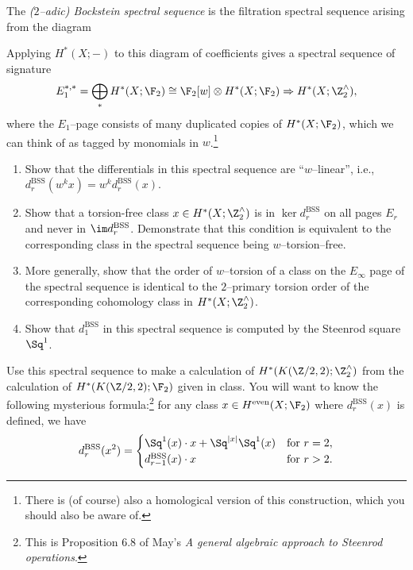 \newcommand{\BSS}{\mathrm{BSS}}

\begin{problem}
The \textit{($2$--adic) Bockstein spectral sequence} is the filtration spectral sequence arising from the diagram
\begin{center}
\end{center}
Applying $H^*(X; -)$ to this diagram of coefficients gives a spectral sequence of signature \[E_1^{*, *} = \bigoplus_* H^*(X; \F_2) \cong \F_2[w] \otimes H^*(X; \F_2) \Rightarrow H^*(X; \Z^\wedge_2),\] where the $E_1$--page consists of many duplicated copies of $H^*(X; \F_2)$, which we can think of as tagged by monomials in $w$.\footnote{There is (of course) also a homological version of this construction, which you should also be aware of.}
\begin{enumerate}
    \item Show that the differentials in this spectral sequence are ``$w$--linear'', i.e., $d^{\BSS}_r(w^k x) = w^k d^{\BSS}_r(x)$.
    \item Show that a torsion-free class $x \in H^*(X; \Z^\wedge_2)$ is in $\ker d^{\BSS}_r$ on all pages $E_r$ and never in $\im d^{\BSS}_r$.  Demonstrate that this condition is equivalent to the corresponding class in the spectral sequence being $w$--torsion--free.
    \item More generally, show that the order of $w$--torsion of a class on the $E_\infty$ page of the spectral sequence is identical to the $2$--primary torsion order of the corresponding cohomology class in $H^*(X; \Z^\wedge_2)$.
    \item Show that $d^{\BSS}_1$ in this spectral sequence is computed by the Steenrod square $\Sq^1$.
\end{enumerate}
\end{problem}

\begin{problem}
Use this spectral sequence to make a calculation of $H^*(K(\Z/2, 2); \Z^\wedge_2)$ from the calculation of $H^*(K(\Z/2, 2); \F_2)$ given in class.  You will want to know the following mysterious formula:\footnote{This is Proposition 6.8 of May's \textit{A general algebraic approach to Steenrod operations}.} for any class $x \in H^{\mathrm{even}}(X; \F_2)$ where $d_r^{\BSS}(x)$ is defined, we have \[d^{\BSS}_r(x^2) = \begin{cases} \Sq^1(x) \cdot x + \Sq^{|x|}\Sq^1(x) & \text{for $r = 2$}, \\ d^{\BSS}_{r-1}(x) \cdot x & \text{for $r > 2$}. \end{cases}\]
\end{problem}

